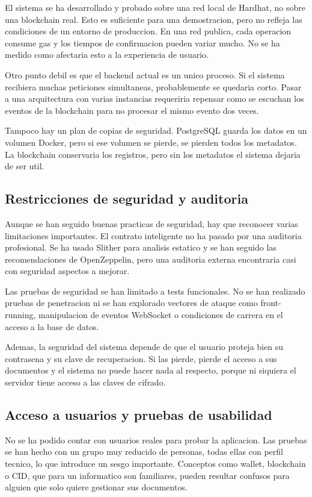 \documentclass[11pt, a4paper]{article}
\begin{document}
El sistema se ha desarrollado y probado sobre una red local de Hardhat, no sobre una blockchain real. Esto es suficiente para una demostracion, pero no refleja las condiciones de un entorno de produccion. En una red publica, cada operacion consume gas y los tiempos de confirmacion pueden variar mucho. No se ha medido como afectaria esto a la experiencia de usuario.

Otro punto debil es que el backend actual es un unico proceso. Si el sistema recibiera muchas peticiones simultaneas, probablemente se quedaria corto. Pasar a una arquitectura con varias instancias requeriria repensar como se escuchan los eventos de la blockchain para no procesar el mismo evento dos veces.

Tampoco hay un plan de copias de seguridad. PostgreSQL guarda los datos en un volumen Docker, pero si ese volumen se pierde, se pierden todos los metadatos. La blockchain conservaria los registros, pero sin los metadatos el sistema dejaria de ser util.

\subsection{Restricciones de seguridad y auditoria}

Aunque se han seguido buenas practicas de seguridad, hay que reconocer varias limitaciones importantes. El contrato inteligente no ha pasado por una auditoria profesional. Se ha usado Slither para analisis estatico y se han seguido las recomendaciones de OpenZeppelin, pero una auditoria externa encontraria casi con seguridad aspectos a mejorar.

Las pruebas de seguridad se han limitado a tests funcionales. No se han realizado pruebas de penetracion ni se han explorado vectores de ataque como front-running, manipulacion de eventos WebSocket o condiciones de carrera en el acceso a la base de datos.

Ademas, la seguridad del sistema depende de que el usuario proteja bien su contrasena y su clave de recuperacion. Si las pierde, pierde el acceso a sus documentos y el sistema no puede hacer nada al respecto, porque ni siquiera el servidor tiene acceso a las claves de cifrado.

\subsection{Acceso a usuarios y pruebas de usabilidad}

No se ha podido contar con usuarios reales para probar la aplicacion. Las pruebas se han hecho con un grupo muy reducido de personas, todas ellas con perfil tecnico, lo que introduce un sesgo importante. Conceptos como wallet, blockchain o CID, que para un informatico son familiares, pueden resultar confusos para alguien que solo quiere gestionar sus documentos.
\end{document}
